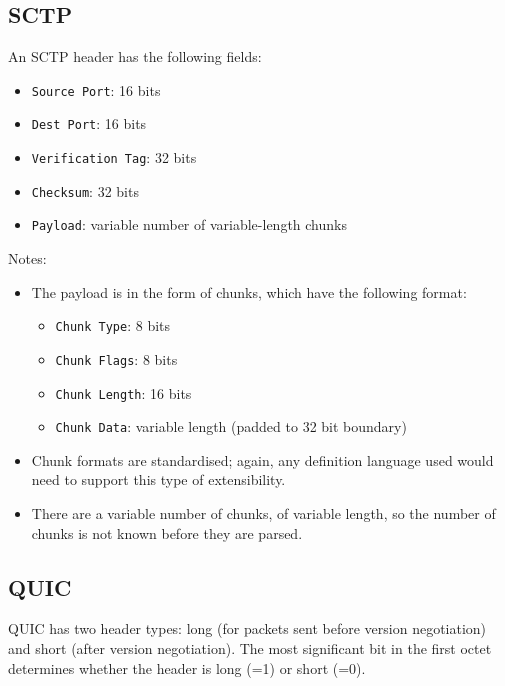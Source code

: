 \documentclass[10pt]{article}
\begin{document}
\subsection{SCTP}

An SCTP header has the following fields:
\begin{itemize}
\item \texttt{Source Port}: 16 bits
\item \texttt{Dest Port}: 16 bits
\item \texttt{Verification Tag}: 32 bits
\item \texttt{Checksum}: 32 bits
\item \texttt{Payload}: variable number of variable-length chunks
\end{itemize}

Notes:
\begin{itemize}
\item The payload is in the form of chunks, which have the following format:
\begin{itemize}
\item \texttt{Chunk Type}: 8 bits
\item \texttt{Chunk Flags}: 8 bits
\item \texttt{Chunk Length}: 16 bits
\item \texttt{Chunk Data}: variable length (padded to 32 bit boundary)
\end{itemize}
\item Chunk formats are standardised; again, any definition language used would need to
support this type of extensibility. 
\item There are a variable number of chunks, of variable length, so the number of chunks
is not known before they are parsed.
\end{itemize}

\subsection{QUIC}

QUIC has two header types: long (for packets sent before version negotiation) and short
(after version negotiation). The most significant bit in the first octet determines
whether the header is long (=1) or short (=0).
\end{document}
